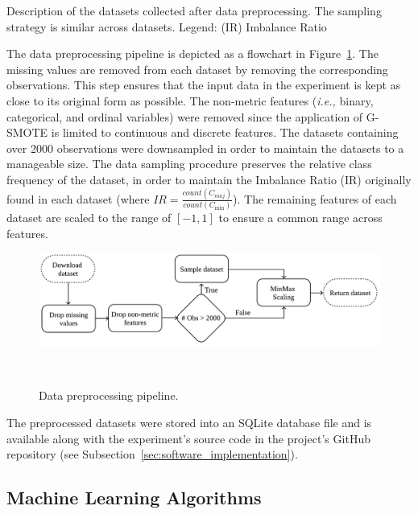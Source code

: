 \documentclass[parskip=full]{scrartcl}
\begin{document}
\begin{table}[H]
    \centering
    \setlength{\tabcolsep}{2pt}
    \caption{\label{tab:datasets_description}
        Description of the datasets collected after data preprocessing. The
        sampling strategy is similar across datasets. Legend: (IR) Imbalance
        Ratio
    }
\end{table}

The data preprocessing pipeline is depicted as a flowchart in
Figure~\ref{fig:data_preprocessing}. The missing values are removed from each
dataset by removing the corresponding observations. This step ensures that the
input data in the experiment is kept as close to its original form as
possible. The non-metric features (\textit{i.e.,} binary, categorical, and
ordinal variables) were removed since the application of G-SMOTE is limited to
continuous and discrete features. The datasets containing over 2000
observations were downsampled in order to maintain the datasets to a
manageable size. The data sampling procedure preserves the relative class
frequency of the dataset, in order to maintain the Imbalance Ratio (IR)
originally found in each dataset (where $IR =
\frac{count(C_{maj})}{count(C_{\min})}$). The remaining features of each
dataset are scaled to the range of $[-1, 1]$ to ensure a common range across
features.

\begin{figure}[t]
	\centering
	\includegraphics[width=.8\linewidth]{../analysis/data_preprocessing}
    \caption{%
        Data preprocessing pipeline.
    }~\label{fig:data_preprocessing}
\end{figure}

The preprocessed datasets were stored into an SQLite database file and is
available along with the experiment's source code in the project's GitHub
repository (see Subsection~\ref{sec:software_implementation}).
 
\subsection{Machine Learning Algorithms}~\label{sec:machine_learning_algorithms}
\end{document}
